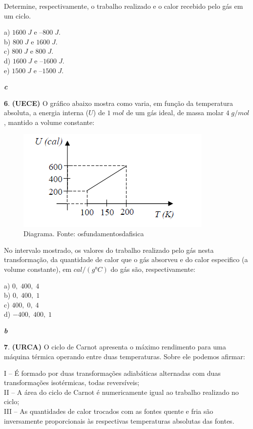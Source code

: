 \documentclass[12pt]{article}
\newenvironment{resposta*}
{\bf Resposta:\\ }
{}
\begin{document}
Determine, respectivamente, o trabalho realizado e o calor recebido pelo gás em um ciclo.


a) $1600\;J$ e $–800\;J$. \\
b) $800\;J$ e $1600\;J$. \\
c) $800\;J$ e $800\;J$. \\
d) $1600\;J$ e $–1600\;J$. \\
e) $1500\;J$ e $–1500\;J$.


\begin{resposta*}
{\it \textbf{c}}
\end{resposta*}

\textbf{6}. \textbf{(UECE)} O gráfico abaixo mostra como varia, em função da temperatura absoluta, a energia interna ($U$) de $1\;mol$ de um gás ideal, de massa molar $4\;g/mol$, mantido a volume constante:


\begin{figure}[h]{}
\centering\includegraphics[width=2.5truein]{img20.png}
\caption{Diagrama. Fonte: osfundamentosdafisica}
\centering
\end{figure}

No intervalo mostrado, os valores do trabalho realizado pelo gás nesta transformação, da quantidade de calor que o gás absorveu e do calor especifico (a volume constante), em $cal/(g°C)$ do gás são, respectivamente:


a) $0,\;400,\;4$ \\
b) $0,\;400,\;1$ \\
c) $400,\;0,\;4$ \\
d) $-400,\;400,\;1$


\begin{resposta*}
{\it \textbf{b}}
\end{resposta*}

\textbf{7}. \textbf{(URCA)} O ciclo de Carnot apresenta o máximo rendimento para uma máquina térmica operando entre duas temperaturas. Sobre ele podemos afirmar:


I – É formado por duas transformações adiabáticas alternadas com duas transformações isotérmicas, todas reversíveis; \\
II – A área do ciclo de Carnot é numericamente igual ao trabalho realizado no ciclo; \\
III – As quantidades de calor trocados com as fontes quente e fria são inversamente proporcionais às respectivas temperaturas absolutas das fontes.
\end{document}
